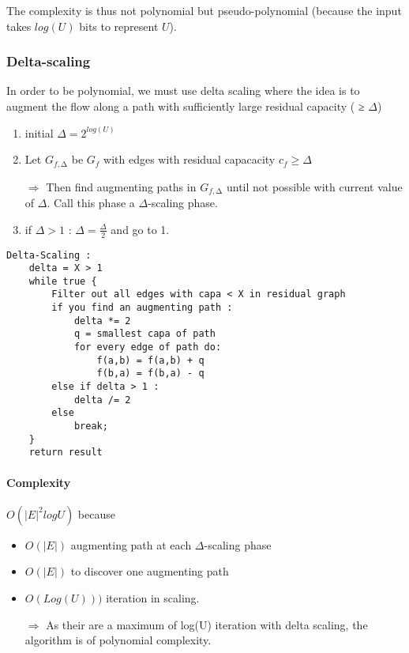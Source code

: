 The complexity is thus not polynomial but
pseudo-polynomial (because the input takes $log(U)$ bits to represent
$U$). 

\subsubsection{Delta-scaling}
In order to be polynomial, we must use
delta scaling where the idea is to augment the flow along a path with sufficiently large
residual capacity ( ≥ $\Delta$)

\begin{enumerate}
    \item initial $\Delta = 2^{log(U)}$
    \item Let $G_{f,∆}$ be $G_f$ with edges with residual capacacity $c_f \geq \Delta$ 

        $\Rightarrow$ Then find augmenting paths in $G_{f,∆}$ until not
        possible with current value of $\Delta$. Call this phase a
        $\Delta$-scaling phase.

    \item if $\Delta > 1$ : $\Delta = \frac{\Delta}{2}$ and go to 1.

\end{enumerate}

\begin{lstlisting}
Delta-Scaling :
    delta = X > 1
    while true {
        Filter out all edges with capa < X in residual graph
        if you find an augmenting path :
            delta *= 2
            q = smallest capa of path
            for every edge of path do:
                f(a,b) = f(a,b) + q
                f(b,a) = f(b,a) - q
        else if delta > 1 :
            delta /= 2
        else
            break;
    }
    return result
\end{lstlisting}

\paragraph{Complexity}
$O(|E|^2 log U)$ because 
\begin{itemize} 
        \item $O(|E|)$ augmenting path at each $\Delta$-scaling phase
        \item $O(|E|)$ to discover one augmenting path
        \item $O(Log(U)))$ iteration in scaling.
            
            $\Rightarrow$ As their are a maximum of log(U) iteration with delta scaling, the
            algorithm is of polynomial complexity.
    \end{itemize}

